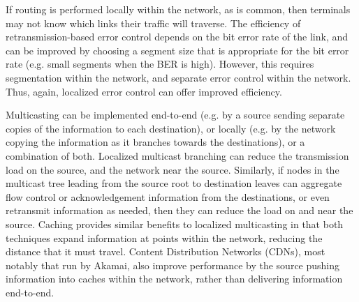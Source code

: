\documentclass[a4paper,11pt,notitlepage,twoside,openright]{article}
\begin{document}
If routing is performed locally within the network, as is common, then
terminals may not know which links their traffic will traverse. The
efficiency of retransmission-based error control depends on the bit
error rate of the link, and can be improved by choosing a segment size
that is appropriate for the bit error rate (e.g. small segments when the
BER is high). However, this requires segmentation within the network,
and separate error control within the network. Thus, again, localized
error control can offer improved efficiency.

Multicasting can be implemented end-to-end (e.g. by a source sending
separate copies of the information to each destination), or locally
(e.g. by the network copying the information as it branches towards the
destinations), or a combination of both. Localized multicast branching
can reduce the transmission load on the source, and the network near the
source. Similarly, if nodes in the multicast tree leading from the
source root to destination leaves can aggregate flow control or
acknowledgement information from the destinations, or even retransmit
information as needed, then they can reduce the load on and near the
source. Caching provides similar benefits to localized multicasting in
that both techniques expand information at points within the network,
reducing the distance that it must travel. Content Distribution Networks
(CDNs), most notably that run by Akamai, also improve performance by the
source pushing information into caches within the network, rather than
delivering information end-to-end.
\end{document}
